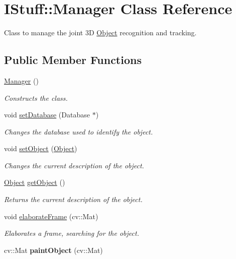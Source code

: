 \hypertarget{class_i_stuff_1_1_manager}{\section{I\-Stuff\-:\-:Manager Class Reference}
\label{class_i_stuff_1_1_manager}
}


Class to manage the joint 3\-D \hyperlink{class_i_stuff_1_1_object}{Object} recognition and tracking.  


\subsection*{Public Member Functions}
\begin{DoxyCompactItemize}
\item 
\hypertarget{class_i_stuff_1_1_manager_a1658ff9f18e38ccd9cb8b0b371b9c20b}{\hyperlink{class_i_stuff_1_1_manager_a1658ff9f18e38ccd9cb8b0b371b9c20b}{Manager} ()}\label{class_i_stuff_1_1_manager_a1658ff9f18e38ccd9cb8b0b371b9c20b}

\begin{DoxyCompactList}\small\item\em Constructs the class. \end{DoxyCompactList}\item 
void \hyperlink{class_i_stuff_1_1_manager_aa91ba11affc3ec961acaf81fc5c5e62d}{set\-Database} (Database $\ast$)
\begin{DoxyCompactList}\small\item\em Changes the database used to identify the object. \end{DoxyCompactList}\item 
void \hyperlink{class_i_stuff_1_1_manager_ab90926d6eb67361ac587d10081aef667}{set\-Object} (\hyperlink{class_i_stuff_1_1_object}{Object})
\begin{DoxyCompactList}\small\item\em Changes the current description of the object. \end{DoxyCompactList}\item 
\hyperlink{class_i_stuff_1_1_object}{Object} \hyperlink{class_i_stuff_1_1_manager_a80d15a0a83976f63c357f65b20387e02}{get\-Object} ()
\begin{DoxyCompactList}\small\item\em Returns the current description of the object. \end{DoxyCompactList}\item 
void \hyperlink{class_i_stuff_1_1_manager_a47f17fa372382713bcc0f37aae006745}{elaborate\-Frame} (cv\-::\-Mat)
\begin{DoxyCompactList}\small\item\em Elaborates a frame, searching for the object. \end{DoxyCompactList}\item 
\hypertarget{class_i_stuff_1_1_manager_afed6c2adc5a4b65bd630d2a042df987b}{cv\-::\-Mat {\bfseries paint\-Object} (cv\-::\-Mat)}\label{class_i_stuff_1_1_manager_afed6c2adc5a4b65bd630d2a042df987b}

\end{DoxyCompactItemize}
